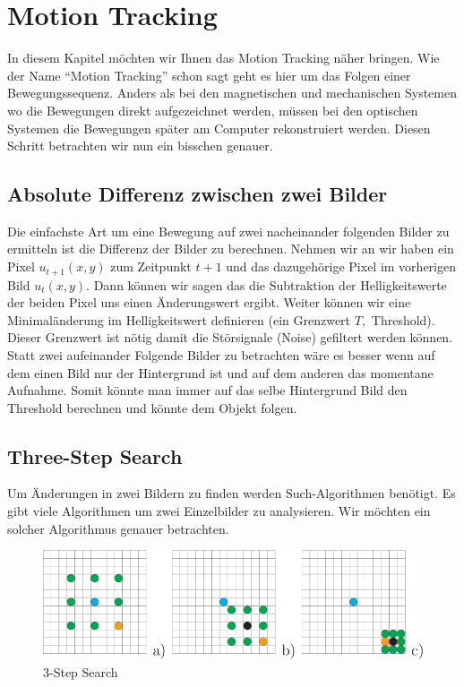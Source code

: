 \chapter{Motion Tracking}

In diesem Kapitel möchten wir Ihnen das Motion Tracking näher bringen. Wie der Name ``Motion Tracking'' schon sagt geht es hier um das Folgen einer Bewegungssequenz. Anders als bei den magnetischen und mechanischen Systemen wo die Bewegungen direkt aufgezeichnet werden, müssen bei den optischen Systemen die Bewegungen später am Computer rekonstruiert werden. Diesen Schritt betrachten wir nun ein bisschen genauer.

\section{Absolute Differenz zwischen zwei Bilder}
\label{sec:absolute_diff}
Die einfachste Art um eine Bewegung auf zwei nacheinander folgenden Bilder zu ermitteln ist die Differenz der Bilder zu berechnen. Nehmen wir an wir haben ein Pixel $ u_{t+1}(x,y) $ zum Zeitpunkt $ t+1 $ und das dazugehörige Pixel im vorherigen Bild $ u_{t}(x,y) $. Dann können wir sagen das die Subtraktion der Helligkeitswerte der beiden Pixel uns einen Änderungswert ergibt. Weiter können wir eine Minimaländerung im Helligkeitswert definieren (ein Grenzwert $T, $ Threshold). Dieser Grenzwert ist nötig damit die Störsignale (Noise) gefiltert werden können.\\
Statt zwei aufeinander Folgende Bilder zu betrachten wäre es besser wenn auf dem einen Bild nur der Hintergrund ist und auf dem anderen das momentane Aufnahme. Somit könnte man immer auf das selbe Hintergrund Bild den Threshold berechnen und könnte dem Objekt folgen. 

\section{Three-Step Search}
Um Änderungen in zwei Bildern zu finden werden Such-Algorithmen benötigt. Es gibt viele Algorithmen um zwei Einzelbilder zu analysieren. Wir möchten ein solcher Algorithmus genauer betrachten.

\begin{figure}[htbp]
\centering
\includegraphics[scale=0.5]{include/3step.png}
\caption{3-Step Search}
\end{figure}


